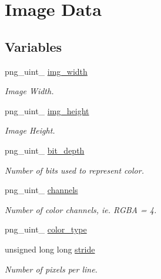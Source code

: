 \hypertarget{group__img__data}{
\section{Image Data}
\label{group__img__data}
}
\subsection*{Variables}
\begin{DoxyCompactItemize}
\item 
png\_\-uint\_ \hyperlink{group__img__data_gac598fa97ed1e4b7114185df9a56a4091}{img\_\-width}
\begin{DoxyCompactList}\small\item\em Image Width. \item\end{DoxyCompactList}\item 
png\_\-uint\_ \hyperlink{group__img__data_ga5df71b6997d910cdf331cca8996280cb}{img\_\-height}
\begin{DoxyCompactList}\small\item\em Image Height. \item\end{DoxyCompactList}\item 
png\_\-uint\_ \hyperlink{group__img__data_ga7835dc8f575f80d4d1cf7aef1d63f81b}{bit\_\-depth}
\begin{DoxyCompactList}\small\item\em Number of bits used to represent color. \item\end{DoxyCompactList}\item 
png\_\-uint\_ \hyperlink{group__img__data_ga34b2a4058f8d03cffc2a310976840088}{channels}
\begin{DoxyCompactList}\small\item\em Number of color channels, ie. RGBA = 4. \item\end{DoxyCompactList}\item 
png\_\-uint\_ \hyperlink{group__img__data_ga24c3e362df0ac2d93d0d93b204591822}{color\_\-type}
\item 
unsigned long long \hyperlink{group__img__data_gae22a1caf8c1be2e52197e6da2f5c7bb6}{stride}
\begin{DoxyCompactList}\small\item\em Number of pixels per line. \item\end{DoxyCompactList}\end{DoxyCompactItemize}


